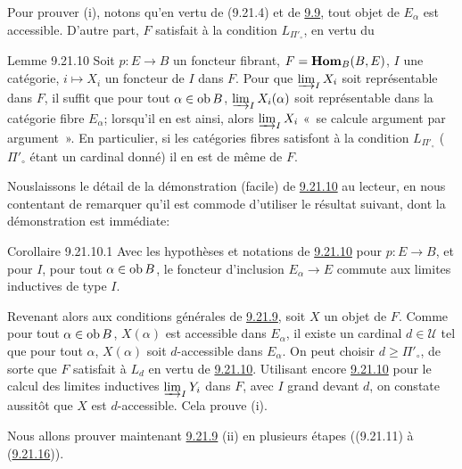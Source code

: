 \documentclass[10pt]{../fichiers-configuration-latex/smfart}
\begin{document}
Pour prouver (i), notons qu'en vertu de (9.21.4) et de
\hyperref[I.cor9.9]{9.9}, tout
objet de $E_{\alpha}$ est accessible. D'autre part, $F$ satisfait à
la condition $L_{\Pi'_\circ}$, en vertu du


\begin{enonce*}{Lemme 9.21.10}
Soit $p:E\rightarrow B$ un foncteur fibrant, $F=\operatorname{\mathbf{Hom}}_B(B,E)$, $I$
une catégorie, $i\mapsto X_i$ un foncteur de $I$ dans $F$. Pour que
$\varinjlim_I X_i$ soit représentable dans $F$, il suffit que pour
tout $\alpha\in \operatorname{ob} B$, $\varinjlim_I X_i(\alpha)$ soit
représentable dans la catégorie fibre $E_{\alpha}$; lorsqu'il en est
ainsi, alors $\varinjlim_I X_i$ « se calcule argument par argument ».
En particulier, si les catégories fibres satisfont à la
condition $L_{\Pi'_\circ}$ ($\Pi'_\circ$ étant un cardinal donné) il
en est de même de $F$.
\end{enonce*}

Nous\pageoriginale laissons le détail de la démonstration (facile)
de \hyperref[I.lem9.21.10]{9.21.10} au lecteur, en nous contentant de remarquer qu'il est
commode d'utiliser le résultat suivant, dont la démonstration est
immédiate:

\begin{enonce*}{Corollaire 9.21.10.1}
Avec les hypothèses et notations de \hyperref[I.lem9.21.10]{9.21.10} pour
$p:E\rightarrow B$, et pour $I$, pour tout $\alpha\in \operatorname{ob} B$, le
foncteur d'inclusion $E_{\alpha}\rightarrow E$ commute aux limites
inductives de type $I$.
\end{enonce*}

Revenant alors aux conditions générales de \hyperref[I.lem9.21.9]{9.21.9}, soit
$X$ un objet de $F$. Comme pour tout $\alpha \in \operatorname{ob} B$, $X(\alpha)$
est accessible dans $E_{\alpha}$, il existe un cardinal $d\in
𝒰$ tel que pour tout $\alpha$, $X(\alpha)$ soit
$d$-accessible dans $E_{\alpha}$. On peut choisir $d\geq
\Pi'_{\circ}$, de sorte que $F$ satisfait à $L_d$ en vertu de
\hyperref[I.lem9.21.10]{9.21.10}. Utilisant encore \hyperref[I.lem9.21.10]{9.21.10} pour le
calcul des limites inductives $\varinjlim_I Y_i$ dans $F$, avec $I$
grand devant $d$, on constate aussitôt que $X$ est $d$-accessible.
Cela prouve (i).

Nous allons prouver maintenant \hyperref[I.lem9.21.9]{9.21.9} (ii) en plusieurs étapes
((9.21.11) à (\hyperref[I.lem9.21.16]{9.21.16})).
\end{document}
